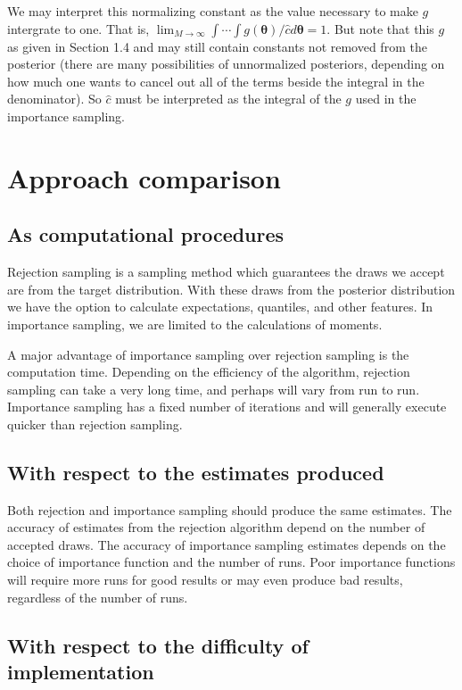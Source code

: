 \documentclass[12pt]{article}
\newcommand{\m}[1]{\mathbf{\bm{#1}}}
\begin{document}
\noindent We may interpret this normalizing constant as the value necessary to make $g$ intergrate to one. That is, $\lim_{M\rightarrow\infty} \int\cdots\int g(\m{\theta})/\hat{c}d\m{\theta} = 1$. But note that this $g$ as given in Section 1.4 and may still contain constants not removed from the posterior (there are many possibilities of unnormalized posteriors, depending on how much one wants to cancel out all of the terms beside the integral in the denominator). So $\hat{c}$ must be interpreted as the integral of the $g$ used in the importance sampling.

\section{Approach comparison}

\subsection{As computational procedures}

\noindent Rejection sampling is a sampling method which guarantees the draws we accept are from the target distribution. With these draws from the posterior distribution we have the option to calculate expectations, quantiles, and other features. In importance sampling, we are limited to the calculations of moments.
\bigskip

\noindent A major advantage of importance sampling over rejection sampling is the computation time. Depending on the efficiency of the algorithm, rejection sampling can take a very long time, and perhaps will vary from run to run. Importance sampling has a fixed number of iterations and will generally execute quicker than rejection sampling.

\subsection{With respect to the estimates produced}

\noindent Both rejection and importance sampling should produce the same estimates. The accuracy of estimates from the rejection algorithm depend on the number of accepted draws. The accuracy of importance sampling estimates depends on the choice of importance function and the number of runs. Poor importance functions will require more runs for good results or may even produce bad results, regardless of the number of runs.

\subsection{With respect to the difficulty of implementation}
\end{document}
